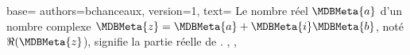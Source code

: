 {
  base={
    authors={bchanceaux},
    version={1},
    text={%
      Le nombre réel $\MDBMeta{a}$ d’un nombre complexe $\MDBMeta{z} = \MDBMeta{a} + \MDBMeta{i} \MDBMeta{b}$, noté $\Re(\MDBMeta{z}$), signifie la partie réelle de .
    },
  },
}
